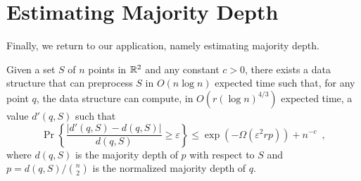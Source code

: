 \documentclass{patmorin}
\newcommand{\eps}{\varepsilon}
\begin{document}
%
%

\section{Estimating Majority Depth}

Finally, we return to our application, namely estimating majority depth. 

\begin{thm}
  Given a set $S$ of $n$ points in $\mathbb{R}^2$ and any constant $c>0$,
  there exists a data structure that can preprocess $S$ in $O(n\log n)$
  expected time such that, for any point $q$, the data structure can
  compute, in $O(r(\log n)^{4/3})$ expected time, a value $d'(q,S)$
  such that 
  \[
     \Pr\left\{\frac{|d'(q,S)-d(q,S)|}{d(q,S)} \ge \eps \right\} 
        \le \exp\left(-\Omega\left(\eps^2rp\right)\right) + n^{-c} \enspace ,
  \]
  where $d(q,S)$ is the majority depth of $p$ with respect to $S$ and
  $p=d(q,S)/\binom{n}{2}$ is the normalized majority depth of $q$.
\end{thm}
\end{document}
